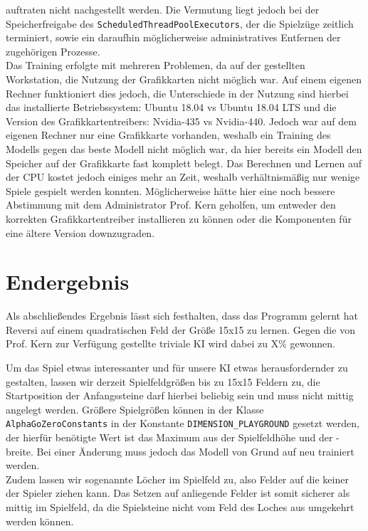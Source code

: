 \documentclass[12pt,a4paper]{article}
\begin{document}
auftraten nicht nachgestellt werden. Die Vermutung liegt jedoch bei der Speicherfreigabe des \texttt{ScheduledThreadPoolExecutors}, der die Spielzüge zeitlich terminiert, sowie ein daraufhin möglicherweise administratives Entfernen der zugehörigen Prozesse. \\
Das Training erfolgte mit mehreren Problemen, da auf der gestellten Workstation, die Nutzung der Grafikkarten nicht möglich war. Auf einem eigenen Rechner funktioniert dies jedoch, die Unterschiede in der Nutzung sind hierbei das installierte Betriebssystem: Ubuntu 18.04 vs Ubuntu 18.04 LTS und die Version des Grafikkartentreibers: Nvidia-435 vs Nvidia-440. Jedoch war auf dem eigenen Rechner nur eine Grafikkarte vorhanden, weshalb ein Training des Modells gegen das beste Modell nicht möglich war, da hier bereits ein Modell den Speicher auf der Grafikkarte fast komplett belegt. Das Berechnen und Lernen auf der CPU kostet jedoch einiges mehr an Zeit, weshalb verhältnismäßig nur wenige Spiele gespielt werden konnten. Möglicherweise hätte hier eine noch bessere Abstimmung mit dem Administrator Prof. Kern geholfen, um entweder den korrekten Grafikkartentreiber installieren zu können oder die Komponenten für eine ältere Version downzugraden.

\newpage

\section{Endergebnis}
Als abschließendes Ergebnis lässt sich festhalten, dass das Programm gelernt hat Reversi auf einem quadratischen Feld der Größe 15x15 zu lernen. Gegen die von Prof. Kern zur Verfügung gestellte triviale KI wird dabei zu X\% gewonnen. 

Um das Spiel etwas interessanter und f\"{u}r unsere KI etwas herausfordernder zu gestalten, lassen wir derzeit Spielfeldgr\"{o}\ss en bis zu 15x15 Feldern zu, die Startposition der Anfangssteine darf hierbei beliebig sein und muss nicht mittig angelegt werden. Gr\"{o}\ss ere Spielgr\"{o}\ss en k\"{o}nnen in der Klasse \texttt{AlphaGoZeroConstants} in der Konstante \texttt{DIMENSION\_PLAYGROUND} gesetzt werden, der hierf\"{u}r ben\"{o}tigte Wert ist das Maximum aus der Spielfeldh\"{o}he und der -breite. Bei einer \"{A}nderung muss jedoch das Modell von Grund auf neu trainiert werden.\\
Zudem lassen wir sogenannte L\"{o}cher im Spielfeld zu, also Felder auf die keiner der Spieler ziehen kann. Das Setzen auf anliegende Felder ist somit sicherer als mittig im Spielfeld, da die Spielsteine nicht vom Feld des Loches aus umgekehrt werden k\"{o}nnen.
\end{document}
